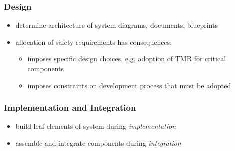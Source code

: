 \documentclass[a4paper, 10pt]{article}
\begin{document}
\subsubsection*{Design}
\begin{itemize}
    \item determine architecture of system \follows diagrams, documents, blueprints
    \item allocation of safety requirements has consequences:
    \begin{itemize}
        \item imposes specific design choices, e.g. adoption of TMR for critical components
        \item imposes constraints on development process that must be adopted
    \end{itemize}
\end{itemize}

\subsubsection*{Implementation and Integration}
\begin{itemize}
    \item build leaf elements of system during \emph{implementation}
    \item assemble and integrate components during \emph{integration}
\end{itemize}
\end{document}
